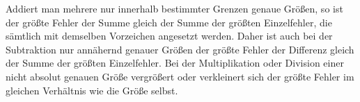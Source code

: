 Addiert man mehrere nur innerhalb bestimmter Grenzen genaue Größen, so ist der größte Fehler der Summe gleich der Summe der größten Einzelfehler, die sämtlich mit demselben Vorzeichen angesetzt werden. Daher ist auch bei der Subtraktion nur annähernd genauer Größen der größte Fehler der Differenz gleich der Summe der größten Einzelfehler. Bei der Multiplikation oder Division einer nicht absolut genauen Größe vergrößert oder verkleinert sich der größte Fehler im gleichen Verhältnis wie die Größe selbst.
